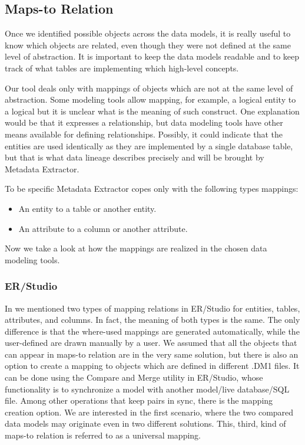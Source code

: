 \subsection{Maps-to Relation}
\label{maps_to_analysis}

Once we identified possible objects across the data models, it is really useful to know which objects are related, even though they were not defined at the same level of abstraction. 
It is important to keep the data models readable and to keep track of what tables are implementing which high-level concepts.

Our tool deals only with mappings of objects which are not at the same level of abstraction. 
Some modeling tools allow mapping, for example, a logical entity to a logical but it is unclear what is the meaning of such construct. 
One explanation would be that it expresses a relationship, but data modeling tools have other means available for defining relationships. 
Possibly, it could indicate that the entities are used identically as they are implemented by a single database table, but that is what data lineage describes precisely and will be brought by Metadata Extractor.

To be specific Metadata Extractor copes only with the following types mappings: 
\begin{itemize}
	\item An entity to a table or another entity. 
	\item An attribute to a column or another attribute.
\end{itemize}
\label{allowed_mappings}

Now we take a look at how the mappings are realized in the chosen data modeling tools.

\subsubsection{ER/Studio}

In  we mentioned two types of mapping relations in ER/Studio for entities, tables, attributes, and columns.
In fact, the meaning of both types is the same. The only difference is that the where-used mappings are generated automatically, while the user-defined are drawn manually by a user. 
We assumed that all the objects that can appear in maps-to relation are in the very same solution, but there is also an option to create a mapping to objects which are defined in different .DM1 files. It can be done using the Compare and Merge utility in ER/Studio, whose functionality is to synchronize a model with another model/live database/SQL file. 
Among other operations that keep pairs in sync, there is the mapping creation option. 
We are interested in the first scenario, where the two compared data models may originate even in two different solutions. 
This, third, kind of maps-to relation is referred to as a universal mapping. \\

